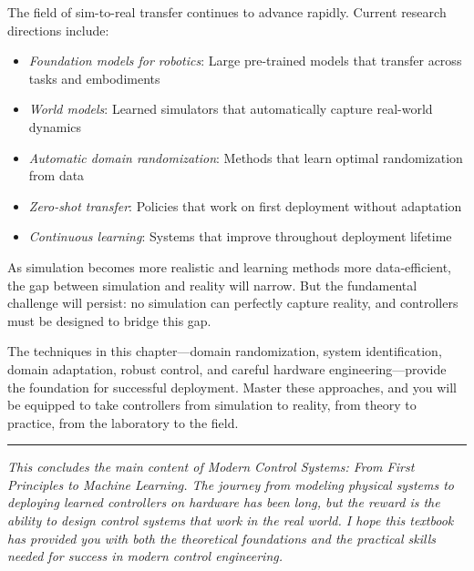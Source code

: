 The field of sim-to-real transfer continues to advance rapidly. Current research directions include:
\begin{itemize}
    \item \textit{Foundation models for robotics}: Large pre-trained models that transfer across tasks and embodiments
    \item \textit{World models}: Learned simulators that automatically capture real-world dynamics
    \item \textit{Automatic domain randomization}: Methods that learn optimal randomization from data
    \item \textit{Zero-shot transfer}: Policies that work on first deployment without adaptation
    \item \textit{Continuous learning}: Systems that improve throughout deployment lifetime
\end{itemize}

As simulation becomes more realistic and learning methods more data-efficient, the gap between simulation and reality will narrow. But the fundamental challenge will persist: no simulation can perfectly capture reality, and controllers must be designed to bridge this gap.

The techniques in this chapter---domain randomization, system identification, domain adaptation, robust control, and careful hardware engineering---provide the foundation for successful deployment. Master these approaches, and you will be equipped to take controllers from simulation to reality, from theory to practice, from the laboratory to the field.

\begin{center}
\rule{0.5\textwidth}{0.5pt}
\end{center}

\textit{This concludes the main content of Modern Control Systems: From First Principles to Machine Learning. The journey from modeling physical systems to deploying learned controllers on hardware has been long, but the reward is the ability to design control systems that work in the real world. I hope this textbook has provided you with both the theoretical foundations and the practical skills needed for success in modern control engineering.}

